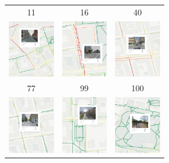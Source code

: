 \documentclass[border={5pt 1pt 5pt 5pt}, varwidth=38em]{standalone}
\begin{document}

\setlength{\tabcolsep}{0.1em}
{
\renewcommand{\arraystretch}{0.5}

\begin{table}[ht]
\centering
\begin{tabular}{ccc}
{\tiny 11} & {\tiny 16} & {\tiny 40}  \\
\includegraphics[width=20mm]{cuts/osm_w64d2_11.png} & \includegraphics[width=20mm]{cuts/osm_w64d2_16.png} & \includegraphics[width=20mm]{cuts/osm_w64d2_40.png}\\
{\tiny 77} & {\tiny 99} & {\tiny 100}  \\
\newline
\includegraphics[width=20mm]{cuts/osm_w64d2_77.png} & \includegraphics[width=20mm]{cuts/osm_w64d2_99.png} & \includegraphics[width=20mm]{cuts/osm_w64d2_100.png}\\
\end{tabular}
\end{table}

}
\end{document}
